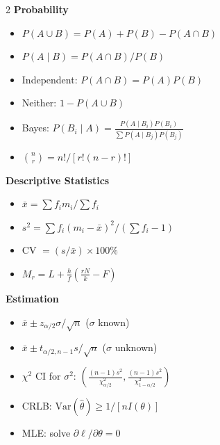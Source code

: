 \documentclass[12pt]{article}
\begin{document}
\newpage

\begin{tcolorbox}[enhanced,arc=0pt,boxrule=0pt,colback=primary,colframe=primary,
  left=16pt,right=16pt,top=12pt,bottom=10pt,borderline south={4pt}{0pt}{accent}]
\end{tcolorbox}
\vspace{8pt}

\begin{tcolorbox}[colback=lightbg,colframe=accent,arc=4pt,boxrule=1.5pt,
  left=10pt,right=10pt,top=8pt,bottom=8pt]
\begin{multicols}{2}
\textbf{\color{primary}Probability}
\begin{itemize}[noitemsep,leftmargin=*,topsep=2pt]
  \item $P(A\cup B)=P(A)+P(B)-P(A\cap B)$
  \item $P(A\mid B)=P(A\cap B)/P(B)$
  \item Independent: $P(A\cap B)=P(A)P(B)$
  \item Neither: $1-P(A\cup B)$
  \item Bayes: $P(B_i\mid A)=\frac{P(A\mid B_i)P(B_i)}{\sum P(A\mid B_j)P(B_j)}$
  \item $\binom{n}{r}=n!/[r!(n-r)!]$
\end{itemize}

\medskip
\textbf{\color{primary}Descriptive Statistics}
\begin{itemize}[noitemsep,leftmargin=*,topsep=2pt]
  \item $\bar x=\sum f_im_i/\sum f_i$
  \item $s^2=\sum f_i(m_i-\bar x)^2/(\sum f_i-1)$
  \item CV $=(s/\bar x)\times100\%$
  \item $M_r=L+\frac{h}{f}(\frac{rN}{k}-F)$
\end{itemize}

\medskip
\textbf{\color{primary}Estimation}
\begin{itemize}[noitemsep,leftmargin=*,topsep=2pt]
  \item $\bar x\pm z_{\alpha/2}\sigma/\sqrt n$ ($\sigma$ known)
  \item $\bar x\pm t_{\alpha/2,n-1}s/\sqrt n$ ($\sigma$ unknown)
  \item $\chi^2$ CI for $\sigma^2$: $\left(\frac{(n-1)s^2}{\chi^2_{\alpha/2}},\frac{(n-1)s^2}{\chi^2_{1-\alpha/2}}\right)$
  \item CRLB: $\text{Var}(\hat\theta)\geq1/[nI(\theta)]$
  \item MLE: solve $\partial\ell/\partial\theta=0$
\end{itemize}


\end{multicols}
\end{tcolorbox}
\end{document}
